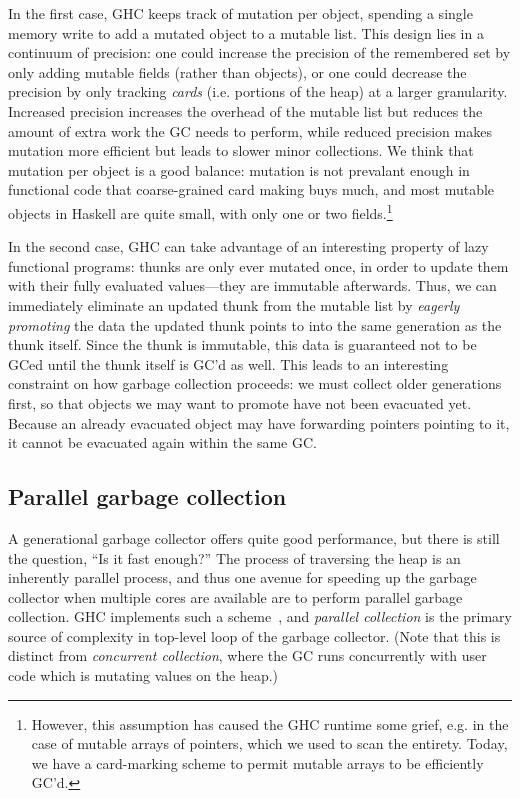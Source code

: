 In the first case, GHC keeps track of mutation per object, spending a
single memory write to add a mutated object to a mutable list.  This
design lies in a continuum of precision: one could increase the
precision of the remembered set by only adding mutable fields (rather
than objects), or one could decrease the precision by only tracking
\emph{cards} (i.e. portions of the heap) at a larger granularity.
Increased precision increases the overhead of the mutable list but
reduces the amount of extra work the GC needs to perform, while reduced
precision makes mutation more efficient but leads to slower minor
collections.  We think that mutation per object is a good balance: mutation
is not prevalant enough in functional code that coarse-grained card making
buys much, and most mutable objects in Haskell are quite small, with only
one or two fields.\footnote{However, this assumption has caused the GHC runtime
some grief, e.g. in the case of mutable arrays of pointers, which we used to
scan the entirety.  Today, we have a card-marking scheme to permit mutable
arrays to be efficiently GC'd.}

In the second case, GHC can take advantage of an interesting property of
lazy functional programs: thunks are only ever mutated once, in order to
update them with their fully evaluated values---they are immutable
afterwards.  Thus, we can immediately eliminate an updated thunk from
the mutable list by \emph{eagerly promoting} the data the updated thunk
points to into the same generation as the thunk itself.  Since the thunk
is immutable, this data is guaranteed not to be GCed until the thunk
itself is GC'd as well.  This leads to an interesting constraint on how
garbage collection proceeds: we must collect older generations first, so
that objects we may want to promote have not been evacuated yet.
Because an already evacuated object may have forwarding pointers
pointing to it, it cannot be evacuated again within the same GC.


\subsection{Parallel garbage collection}

A generational garbage collector offers quite good performance, but
there is still the question, ``Is it fast enough?''  The process of
traversing the heap is an inherently parallel process, and thus one
avenue for speeding up the garbage collector when multiple cores are
available are to perform parallel garbage collection.  GHC implements
such a scheme~\XXX{}, and \emph{parallel collection} is the primary source of
complexity in top-level loop of the garbage collector.  (Note that this
is distinct from \emph{concurrent collection}, where the GC runs concurrently
with user code which is mutating values on the heap.)

